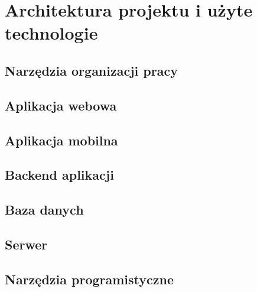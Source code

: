 \chapter{Architektura projektu i użyte technologie}

\section{Narzędzia organizacji pracy}
\section{Aplikacja webowa}
\section{Aplikacja mobilna}
\section{Backend aplikacji}
\section{Baza danych}
\section{Serwer}
\section{Narzędzia programistyczne}
